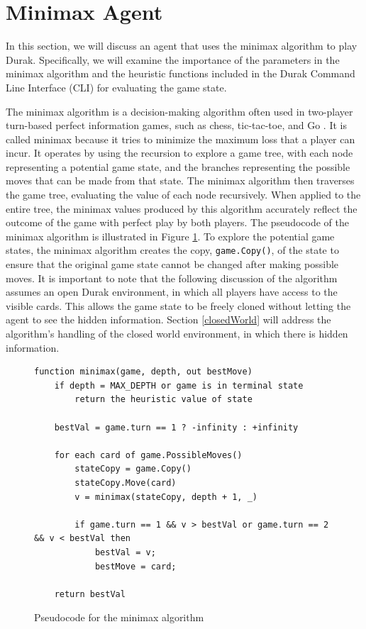 \section{Minimax Agent}
\label{minimax}

In this section, we will discuss an agent that uses the minimax algorithm to play Durak. Specifically, we will examine the importance of the parameters in the minimax algorithm and the heuristic functions included in the Durak Command Line Interface (CLI) for evaluating the game state.

The minimax algorithm is a decision-making algorithm often used in two-player turn-based perfect information games, such as chess, tic-tac-toe, and Go \citep{AI4Ed}. It is called minimax because it tries to minimize the maximum loss that a player can incur. It operates by using the recursion to explore a game tree, with each node representing a potential game state, and the branches representing the possible moves that can be made from that state. The minimax algorithm then traverses the game tree, evaluating the value of each node recursively. When applied to the entire tree, the minimax values produced by this algorithm accurately reflect the outcome of the game with perfect play by both players. The pseudocode of the minimax algorithm is illustrated in Figure \ref{fig:minimaxPseudocode}. To explore the potential game states, the minimax algorithm creates the copy, \texttt{game.Copy()}, of the state to ensure that the original game state cannot be changed after making possible moves. It is important to note that the following discussion of the algorithm assumes an open Durak environment, in which all players have access to the visible cards. This allows the game state to be freely cloned without letting the agent to see the hidden information. Section \ref{closedWorld} will address the algorithm's handling of the closed world environment, in which there is hidden information.

\begin{figure}[h]
\captionsetup{justification=centering}
\begin{lstlisting}
function minimax(game, depth, out bestMove)
    if depth = MAX_DEPTH or game is in terminal state
        return the heuristic value of state
        
    bestVal = game.turn == 1 ? -infinity : +infinity
        
    for each card of game.PossibleMoves()
        stateCopy = game.Copy()
        stateCopy.Move(card)
        v = minimax(stateCopy, depth + 1, _)
		
        if game.turn == 1 && v > bestVal or game.turn == 2 && v < bestVal then
            bestVal = v;
            bestMove = card;
			
    return bestVal
\end{lstlisting}
\caption{Pseudocode for the minimax algorithm}
\label{fig:minimaxPseudocode}
\end{figure}

